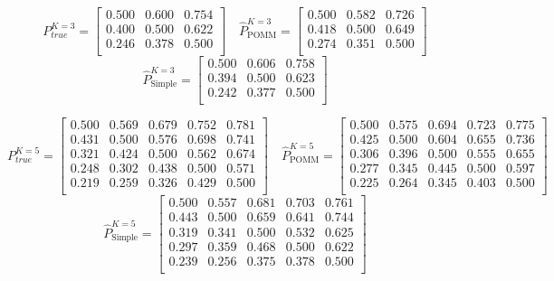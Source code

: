 \documentclass[11pt]{amsart}
\begin{document}
\newpage
\[
P^{K=3}_{true} = 
\left[\begin{array}{ccc}
0.500 & 0.600 & 0.754 \\
0.400 & 0.500 & 0.622 \\
0.246 & 0.378 & 0.500 \\ 
\end{array}\right] \quad 
\hat{P}^{K=3}_{\text{POMM}} = 
\left[\begin{array}{ccc}
0.500 & 0.582 & 0.726 \\
0.418 & 0.500 & 0.649 \\
0.274 & 0.351 & 0.500 \\ 
\end{array}\right] 
\]
\[ 
\hat{P}^{K=3}_{\text{Simple}} = 
\left[\begin{array}{ccc}
0.500 & 0.606 & 0.758 \\
0.394 & 0.500 & 0.623 \\
0.242 & 0.377 & 0.500 \\ 
\end{array}\right]
\]

\[
P^{K=5}_{true} = 
\left[\begin{array}{ccccc}
0.500 & 0.569 & 0.679 & 0.752 & 0.781 \\
0.431 & 0.500 & 0.576 & 0.698 & 0.741 \\
0.321 & 0.424 & 0.500 & 0.562 & 0.674 \\
0.248 & 0.302 & 0.438 & 0.500 & 0.571 \\
0.219 & 0.259 & 0.326 & 0.429 & 0.500 \\
\end{array}\right] \quad   
\hat{P}^{K=5}_{\text{POMM}} = 
\left[\begin{array}{ccccc}
0.500 & 0.575 & 0.694 & 0.723 & 0.775 \\
0.425 & 0.500 & 0.604 & 0.655 & 0.736 \\
0.306 & 0.396 & 0.500 & 0.555 & 0.655 \\
0.277 & 0.345 & 0.445 & 0.500 & 0.597 \\
0.225 & 0.264 & 0.345 & 0.403 & 0.500 \\
\end{array}\right] 
\]
\[ 
\hat{P}^{K=5}_{\text{Simple}} = 
\left[\begin{array}{ccccc}
0.500 & 0.557 & 0.681 & 0.703 & 0.761 \\
0.443 & 0.500 & 0.659 & 0.641 & 0.744 \\
0.319 & 0.341 & 0.500 & 0.532 & 0.625 \\
0.297 & 0.359 & 0.468 & 0.500 & 0.622 \\
0.239 & 0.256 & 0.375 & 0.378 & 0.500 \\
\end{array}\right]
\]
\end{document}
